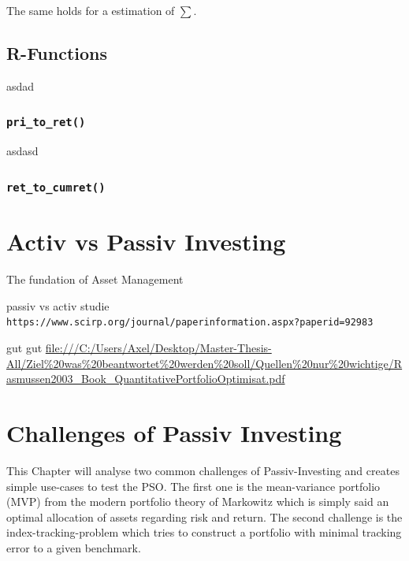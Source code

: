 \documentclass[
  oneside]{book}
\begin{document}
The same holds for a estimation of \(\textstyle\sum\).

\hypertarget{r-functions-2}{%
\section{R-Functions}\label{r-functions-2}}

asdad

\hypertarget{pritoret}{%
\subsection{\texorpdfstring{\texttt{pri\_to\_ret()}}{pri\_to\_ret()}}\label{pritoret}}

asdasd

\hypertarget{ret_to_cumret}{%
\subsection{\texorpdfstring{\texttt{ret\_to\_cumret()}}{ret\_to\_cumret()}}\label{ret_to_cumret}}

\hypertarget{activ-vs-passiv-investing}{%
\chapter{Activ vs Passiv Investing}\label{activ-vs-passiv-investing}}

The fundation of Asset Management

passiv vs activ studie
\texttt{https://www.scirp.org/journal/paperinformation.aspx?paperid=92983}

gut gut
\url{file:///C:/Users/Axel/Desktop/Master-Thesis-All/Ziel\%20was\%20beantwortet\%20werden\%20soll/Quellen\%20nur\%20wichtige/Rasmussen2003_Book_QuantitativePortfolioOptimisat.pdf}

\hypertarget{challenges}{%
\chapter{Challenges of Passiv Investing}\label{challenges}}

This Chapter will analyse two common challenges of Passiv-Investing and creates simple use-cases to test the PSO. The first one is the mean-variance portfolio (MVP) from the modern portfolio theory of Markowitz which is simply said an optimal allocation of assets regarding risk and return. The second challenge is the index-tracking-problem which tries to construct a portfolio with minimal tracking error to a given benchmark.
\end{document}
